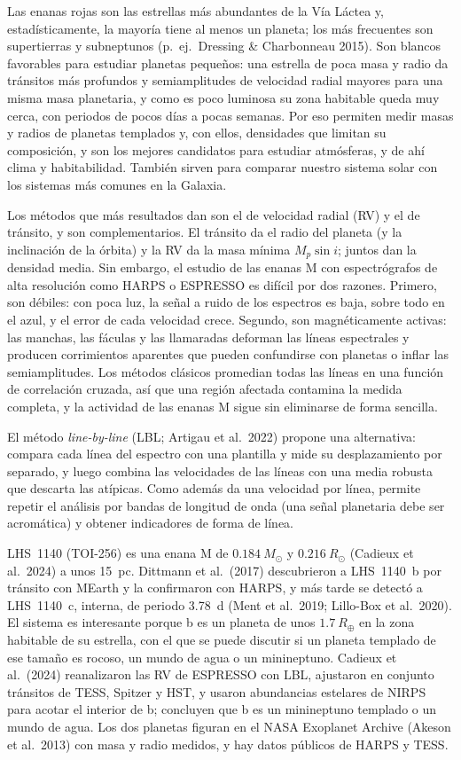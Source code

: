 \documentclass[twocolumn,aps,pra,11pt]{revtex4-2}
\newcommand{\Msun}{\ensuremath{M_\odot}}
\newcommand{\Rsun}{\ensuremath{R_\odot}}
\newcommand{\Rearth}{\ensuremath{R_\oplus}}
\begin{document}
Las enanas rojas son las estrellas más abundantes de la Vía Láctea y, estadísticamente, la mayoría tiene al menos un planeta; los más frecuentes son supertierras y subneptunos (p.\ ej.\ Dressing \& Charbonneau 2015). Son blancos favorables para estudiar planetas pequeños: una estrella de poca masa y radio da tránsitos más profundos y semiamplitudes de velocidad radial mayores para una misma masa planetaria, y como es poco luminosa su zona habitable queda muy cerca, con periodos de pocos días a pocas semanas. Por eso permiten medir masas y radios de planetas templados y, con ellos, densidades que limitan su composición, y son los mejores candidatos para estudiar atmósferas, y de ahí clima y habitabilidad. También sirven para comparar nuestro sistema solar con los sistemas más comunes en la Galaxia.

Los métodos que más resultados dan son el de velocidad radial (RV) y el de tránsito, y son complementarios. El tránsito da el radio del planeta (y la inclinación de la órbita) y la RV da la masa mínima $M_p\sin i$; juntos dan la densidad media. Sin embargo, el estudio de las enanas M con espectrógrafos de alta resolución como HARPS o ESPRESSO es difícil por dos razones. Primero, son débiles: con poca luz, la señal a ruido de los espectros es baja, sobre todo en el azul, y el error de cada velocidad crece. Segundo, son magnéticamente activas: las manchas, las fáculas y las llamaradas deforman las líneas espectrales y producen corrimientos aparentes que pueden confundirse con planetas o inflar las semiamplitudes. Los métodos clásicos promedian todas las líneas en una función de correlación cruzada, así que una región afectada contamina la medida completa, y la actividad de las enanas M sigue sin eliminarse de forma sencilla.

El método \emph{line-by-line} (LBL; Artigau et al.\ 2022) propone una alternativa: compara cada línea del espectro con una plantilla y mide su desplazamiento por separado, y luego combina las velocidades de las líneas con una media robusta que descarta las atípicas. Como además da una velocidad por línea, permite repetir el análisis por bandas de longitud de onda (una señal planetaria debe ser acromática) y obtener indicadores de forma de línea.

LHS~1140 (TOI-256) es una enana M de $0.184~\Msun$ y $0.216~\Rsun$ (Cadieux et al.\ 2024) a unos 15~pc. Dittmann et al.\ (2017) descubrieron a LHS~1140~b por tránsito con MEarth y la confirmaron con HARPS, y más tarde se detectó a LHS~1140~c, interna, de periodo 3.78~d (Ment et al.\ 2019; Lillo-Box et al.\ 2020). El sistema es interesante porque b es un planeta de unos $1.7~\Rearth$ en la zona habitable de su estrella, con el que se puede discutir si un planeta templado de ese tamaño es rocoso, un mundo de agua o un minineptuno. Cadieux et al.\ (2024) reanalizaron las RV de ESPRESSO con LBL, ajustaron en conjunto tránsitos de TESS, Spitzer y HST, y usaron abundancias estelares de NIRPS para acotar el interior de b; concluyen que b es un minineptuno templado o un mundo de agua. Los dos planetas figuran en el NASA Exoplanet Archive (Akeson et al.\ 2013) con masa y radio medidos, y hay datos públicos de HARPS y TESS.
\end{document}
